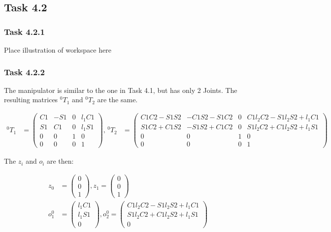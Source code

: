 \subsection*{Task 4.2}

\subsubsection*{Task 4.2.1}
Place illustration of workspace here

\subsubsection*{Task 4.2.2}
The manipulator is similar to the one in Task 4.1, but has only 2 Joints. The resulting matrices $^0T_1$ and $^0T_2$ are the same.

\begin{align*}
^0T_1 &= 
\begin{pmatrix}
C1 & -S1 & 0 & l_1 C1\\
S1 &  C1 & 0 & l_1 S1\\
0  &  0  & 1 & 0\\
0  &  0  & 0 & 1
\end{pmatrix},
\,^0T_2 &= 
\begin{pmatrix}
C1C2-S1S2 & -C1S2-S1C2 & 0 & C1l_2C2-S1l_2S2+l_1C1\\
S1C2+C1S2 & -S1S2+C1C2 & 0 & S1l_2C2+C1l_2S2+l_1S1\\
0  &  0  & 1 & 0\\
0  &  0  & 0 & 1
\end{pmatrix}
\end{align*}

The $z_i$ and $o_i$ are then:

\begin{align*}
z_0 &= 
\begin{pmatrix}
0 \\ 0 \\ 1
\end{pmatrix},
z_1 = 
\begin{pmatrix}
0 \\ 0 \\ 1
\end{pmatrix}\\
o_1^0 &= 
\begin{pmatrix}
l_1C1 \\ l_1S1 \\ 0
\end{pmatrix},
o_2^0 = 
\begin{pmatrix}
C1l_2C2-S1l_2S2+l_1C1 \\ S1l_2C2+C1l_2S2+l_1S1 \\ 0
\end{pmatrix}\\
\end{align*}

